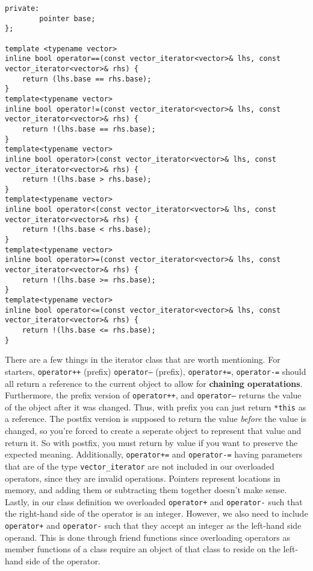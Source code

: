 \documentclass{report}
\begin{document}
\begin{verbatim}
private:
        pointer base;
};

template <typename vector>
inline bool operator==(const vector_iterator<vector>& lhs, const vector_iterator<vector>& rhs) {
    return (lhs.base == rhs.base);
}
template<typename vector>
inline bool operator!=(const vector_iterator<vector>& lhs, const vector_iterator<vector>& rhs) {
    return !(lhs.base == rhs.base);
}
template<typename vector>
inline bool operator>(const vector_iterator<vector>& lhs, const vector_iterator<vector>& rhs) {
    return !(lhs.base > rhs.base);
}
template<typename vector>
inline bool operator<(const vector_iterator<vector>& lhs, const vector_iterator<vector>& rhs) {
    return !(lhs.base < rhs.base);
}
template<typename vector>
inline bool operator>=(const vector_iterator<vector>& lhs, const vector_iterator<vector>& rhs) {
    return !(lhs.base >= rhs.base);
}
template<typename vector>
inline bool operator<=(const vector_iterator<vector>& lhs, const vector_iterator<vector>& rhs) {
    return !(lhs.base <= rhs.base);
}
\end{verbatim}
There are a few things in the iterator class that are worth mentioning. For starters, \texttt{operator++} (prefix) \texttt{operator--} (prefix), \texttt{operator+=}, \texttt{operator-=} should all return a reference to the current object to allow for \textbf{chaining operatations}. Furthermore, the prefix version of \texttt{operator++}, and \texttt{operator--} returns the value of the object after it was changed. Thus, with prefix you can just return \texttt{*this} as a reference. The postfix version is supposed to return the value \textit{before} the value is changed, so you're forced to create a seperate object to represent that value and return it. So with postfix, you must return by value if you want to preserve the expected meaning.
\bigbreak \noindent
Additionally, \texttt{operator+=} and \texttt{operator-=} having parameters that are of the type \texttt{vector\_iterator} are not included in our overloaded operators, since they are invalid operations. Pointers represent locations in memory, and adding them or subtracting them together doesn't make sense.
\bigbreak \noindent
Lastly, in our class definition we overloaded \texttt{operator+} and \texttt{operator-} such that the right-hand side of the operator is an integer. However, we also need to include \texttt{operator+} and \texttt{operator-} such that they accept an integer as the left-hand side operand. This is done through friend functions since overloading operators as member functions of a class require an object of that class to reside on the left-hand side of the operator.
\end{document}
